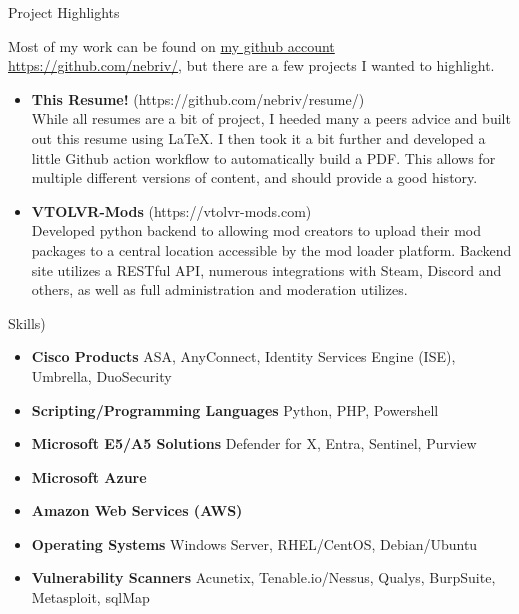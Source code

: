\documentclass[]{mcdowellcv}
\begin{document}
\begin{cvsection}{Project Highlights}
    \begin{cvsubsection}{}{}{}
        Most of my work can be found on \href{https://github.com/nebriv/}{my github account https://github.com/nebriv/}, but there are a few projects I wanted to highlight.\\
        \begin{itemize}
            \setlength\itemsep{3pt}
            \item \textbf{This Resume!} (https://github.com/nebriv/resume/)\\While all resumes are a bit of project, I heeded many a peers advice and built out this resume using LaTeX. I then took it a bit further and developed a little Github action workflow to automatically build a PDF. This allows for multiple different versions of content, and should provide a good history.
            \item \textbf{VTOLVR-Mods} (https://vtolvr-mods.com)\\Developed python backend to allowing mod creators to upload their mod packages to a central location accessible by the mod loader platform. Backend site utilizes a RESTful API, numerous integrations with Steam, Discord and others, as well as full administration and moderation utilizes.
        \end{itemize}
    \end{cvsubsection}
\end{cvsection}

\begin{cvsection}{Skills)}
    \begin{cvsubsection}{}{}{}
        \begin{itemize}
            \item \textbf{Cisco Products}  ASA, AnyConnect, Identity Services Engine (ISE), Umbrella, DuoSecurity
            \item \textbf{Scripting/Programming Languages}  Python, PHP, Powershell
            \item \textbf{Microsoft E5/A5 Solutions}  Defender for X, Entra, Sentinel, Purview
            \item \textbf{Microsoft Azure}
            \item \textbf{Amazon Web Services (AWS)}
            \item \textbf{Operating Systems}  Windows Server, RHEL/CentOS, Debian/Ubuntu
            \item \textbf{Vulnerability Scanners}  Acunetix, Tenable.io/Nessus, Qualys, BurpSuite, Metasploit, sqlMap
        \end{itemize}
    \end{cvsubsection}
\end{cvsection}
\end{document}
